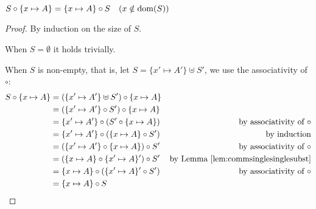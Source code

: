 \begin{lemma}\label{lem:commsingletonsubst}
	$S \circ \{x\mapsto A\} = \{x\mapsto A\} \circ S
	\quad (x \notin \mathop{\mathrm{dom}}(S))$
\end{lemma}
\begin{proof} By induction on the size of $S$.

When $S=\emptyset$ it holds trivially.

When $S$ is non-empty, that is, let $S=\{x'\mapsto A'\}\uplus S'$,
we use the associativity of $\circ$:
\begin{align*}
S\circ\{x\mapsto A\}
&= (\{x'\mapsto A'\}\uplus S') \circ \{x\mapsto A\} \\
&= (\{x'\mapsto A'\}\circ S') \circ \{x\mapsto A\} \\
&= \{x'\mapsto A'\} \circ (S' \circ \{x\mapsto A\})
& \text{by associativity of $\circ$} \\
&= \{x'\mapsto A'\} \circ (\{x\mapsto A\} \circ S')
& \text{by induction} \\
&= (\{x'\mapsto A'\} \circ \{x\mapsto A\}) \circ S'
& \text{by associativity of $\circ$} \\
&= (\{x\mapsto A\} \circ \{x'\mapsto A\}') \circ S'
& \text{by Lemma \ref{lem:commsinglesinglesubst}} \\
&= \{x\mapsto A\} \circ (\{x'\mapsto A\}' \circ S')
& \text{by associativity of $\circ$} \\
&= \{x\mapsto A\} \circ S
\end{align*}
\end{proof}

